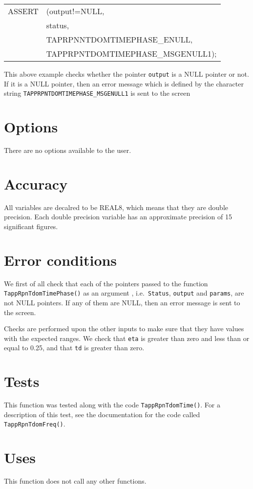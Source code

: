 \documentclass[12pt]{article}
\begin{document}
\vspace{5mm}

\begin{tabular}{ll}
ASSERT & (output!=NULL,  \\
       &  status,    \\
       &  TAPRPNNTDOMTIMEPHASE\_ENULL, \\
       &  TAPPRPNTDOMTIMEPHASE\_MSGENULL1);
\end{tabular}

\vspace{5mm}

This above example checks whether the pointer \texttt{output} is a NULL pointer or not. If it is a NULL pointer, then an error message which is defined by the character string \texttt{TAPPRPNTDOMTIMEPHASE\_MSGENULL1} is sent to the screen


\section{Options}

There are no options available to the user.

\section{Accuracy}

All variables are decalred to be REAL8, which means that they are double precision.
Each double precision variable has an approximate precision of 15 significant figures.


\section{Error conditions}

We first of all check that each of the pointers passed to the function \\ \texttt{TappRpnTdomTimePhase()} as an argument , i.e.\ \texttt{Status}, \texttt{output} and \texttt{params}, are not NULL pointers. If any of them are NULL, then an error message is sent to the screen.

Checks are performed upon the other inputs to make sure that they have values with the expected ranges. We check that \texttt{eta} is greater than zero and less than or equal to 0.25, and that \texttt{td} is greater than zero.

\section{Tests}

This function was tested along with the code \texttt{TappRpnTdomTime()}. For a description of this test, see the documentation for the code called \texttt{TappRpnTdomFreq()}.

\section{Uses}

This function does not call any other functions.
\end{document}
